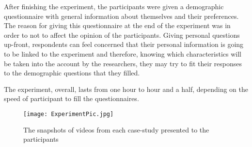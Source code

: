 After finishing the experiment, the participants were given a demographic questionnaire
with general information about themselves and their preferences.
The reason for giving this questionnaire at the end of the experiment was in order
to not to affect the opinion of the participants.
Giving personal questions up-front, respondents can feel concerned that their personal
information is going to be linked to the experiment and therefore, knowing which
characteristics will be taken into the account by the researchers, they may try
to fit their responses to the demographic questions that they filled.
\par The experiment, overall, lasts from one hour to hour and a half, depending
on the speed of participant to fill the questionnaires.

\begin{figure}[hbt!]
  \centering
  \texttt{[image: ExperimentPic.jpg]}
  \caption[]{The snapshots of videos from each case-study presented to the participants\footnotemark}
  \label{fig:ExperimentPic}
\end{figure}

